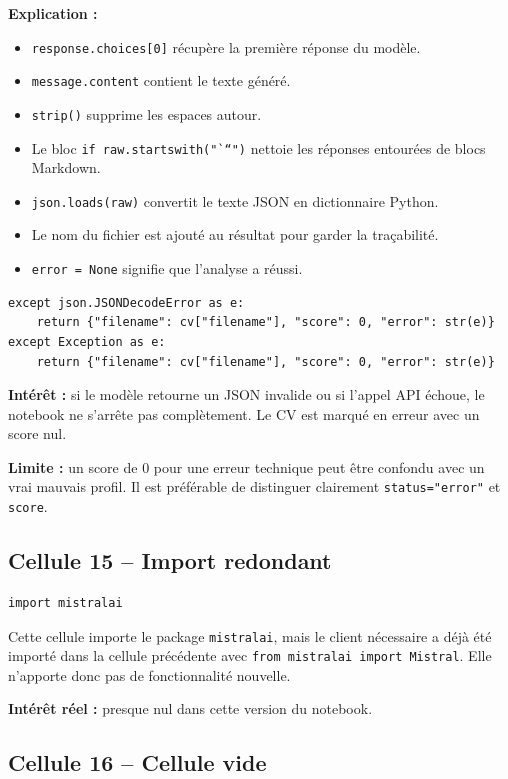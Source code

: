 \documentclass[12pt,a4paper]{article}
\begin{document}
\textbf{Explication :}
\begin{itemize}
  \item \texttt{response.choices[0]} récupère la première réponse du modèle.
  \item \texttt{message.content} contient le texte généré.
  \item \texttt{strip()} supprime les espaces autour.
  \item Le bloc \texttt{if raw.startswith("```")} nettoie les réponses entourées de blocs Markdown.
  \item \texttt{json.loads(raw)} convertit le texte JSON en dictionnaire Python.
  \item Le nom du fichier est ajouté au résultat pour garder la traçabilité.
  \item \texttt{error = None} signifie que l'analyse a réussi.
\end{itemize}

\begin{lstlisting}[style=pythonstyle]
except json.JSONDecodeError as e:
    return {"filename": cv["filename"], "score": 0, "error": str(e)}
except Exception as e:
    return {"filename": cv["filename"], "score": 0, "error": str(e)}
\end{lstlisting}

\textbf{Intérêt :} si le modèle retourne un JSON invalide ou si l'appel API échoue, le notebook ne s'arrête pas complètement. Le CV est marqué en erreur avec un score nul.

\textbf{Limite :} un score de 0 pour une erreur technique peut être confondu avec un vrai mauvais profil. Il est préférable de distinguer clairement \texttt{status="error"} et \texttt{score}.

\subsection{Cellule 15 -- Import redondant}

\begin{lstlisting}[style=pythonstyle]
import mistralai
\end{lstlisting}

Cette cellule importe le package \texttt{mistralai}, mais le client nécessaire a déjà été importé dans la cellule précédente avec \texttt{from mistralai import Mistral}. Elle n'apporte donc pas de fonctionnalité nouvelle.

\textbf{Intérêt réel :} presque nul dans cette version du notebook.

\subsection{Cellule 16 -- Cellule vide}
\end{document}
